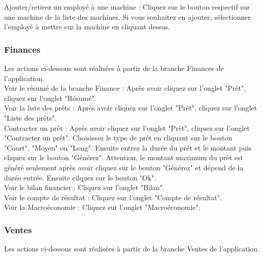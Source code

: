 Ajouter/retirez un employé à une machine : Cliquez sur le bouton respectif sur une machine de la liste des machines. Si vous souhaitez en ajouter, sélectionner l'employé à mettre sur la machine en cliquant dessus. \\



\subsubsection*{Finances}



Les actions ci-dessous sont réalisées à partir de la branche Finances de l'application.\\

Voir le résumé de la branche Finance : Après avoir cliquez sur l'onglet "Prêt", cliquez sur l'onglet "Résumé". \\

Voir la liste des prêts : Après avoir cliquez sur l'onglet "Prêt", cliquez sur l'onglet "Liste des prêts". \\

Contracter un prêt : Après avoir cliquez sur l'onglet "Prêt", cliquez sur l'onglet "Contracter un prêt". Choisissez le type de prêt en cliquant sur le bouton "Court", "Moyen" ou "Long". Ensuite entrez la durée du prêt et le montant puis cliquez sur le bouton "Générez". Attention, le montant maximum du prêt est généré seulement après avoir cliquez sur le bouton "Générez" et dépend de la durée entrée. Ensuite cilquez sur le bouton "Ok". \\

Voir le bilan financier : Cliquez sur l'onglet "Bilan". \\

Voir le compte de résultat : Cliquez sur l'onglet "Compte de résultat". \\

Voir la Macroéconomie : Cliquez sur l'onglet "Macroéconomie". \\



\subsubsection*{Ventes}



Les actions ci-dessous sont réalisées à partir de la branche Ventes de l'application.\\

